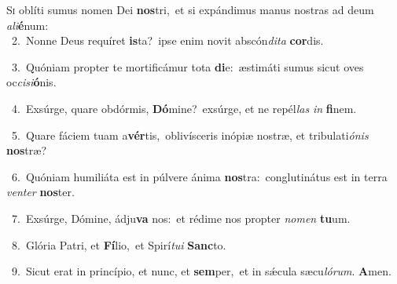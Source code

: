 \lettrine{\initial\textcolor{\initialcolor}{S}}{i} oblíti sumus nomen Dei \textbf{nos}\-tri,~\star et si expándimus manus nostras ad deum \textit{a}\-\textit{li}\textbf{é}num:\\
{\numbfont\textcolor{\numbcolor}{~2.}}~Nonne Deus requíret \textbf{is}\-ta?~\star ipse enim novit abscón\-\textit{di}\-\textit{ta} \textbf{cor}\-dis.\par
{\numbfont\textcolor{\numbcolor}{~3.}}~Quóniam propter te mortificámur tota \textbf{di}\-e:~\star æstimáti sumus sicut oves oc\-\textit{ci}\-\textit{si}\textbf{ó}nis.\par
{\numbfont\textcolor{\numbcolor}{~4.}}~Exsúrge, quare obdórmis, \textbf{Dó}\-mine?~\star exsúrge, et ne repél\textit{las} \textit{in} \textbf{fi}\-nem.\par
{\numbfont\textcolor{\numbcolor}{~5.}}~Quare fáciem tuam a\-\textbf{vér}\-tis,~\star oblivísceris inópiæ nostræ, et tribulati\-\textit{ó}\-\textit{nis} \textbf{nos}\-træ?\par
{\numbfont\textcolor{\numbcolor}{~6.}}~Quóniam humiliáta est in púlvere ánima \textbf{nos}\-tra:~\star conglutinátus est in terra \textit{ven}\-\textit{ter} \textbf{nos}\-ter.\par
{\numbfont\textcolor{\numbcolor}{~7.}}~Exsúrge, Dómine, ádju\textbf{va} nos:~\star et rédime nos propter \textit{no}\-\textit{men} \textbf{tu}\-um.\par
{\numbfont\textcolor{\numbcolor}{~8.}}~Glória Patri, et \textbf{Fí}\-lio,~\star et Spirí\-\textit{tu}\-\textit{i} \textbf{Sanc}\-to.\par
{\numbfont\textcolor{\numbcolor}{~9.}}~Sicut erat in princípio, et nunc, et \textbf{sem}\-per,~\star et in sǽcula sæcu\-\textit{ló}\-\textit{rum}. \textbf{A}\-men.\par
